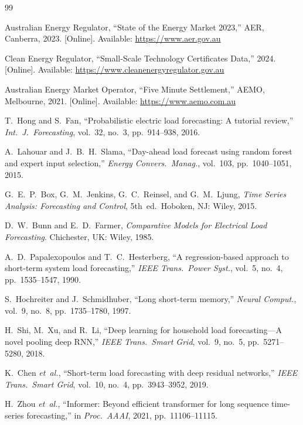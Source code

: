 \documentclass[12pt,a4paper]{article}
\begin{document}
\begin{thebibliography}{99}

Australian Energy Regulator, ``State of the Energy Market 2023,'' AER,
Canberra, 2023. [Online]. Available: \url{https://www.aer.gov.au}

Clean Energy Regulator, ``Small-Scale Technology Certificates Data,'' 2024.
[Online]. Available: \url{https://www.cleanenergyregulator.gov.au}

Australian Energy Market Operator, ``Five Minute Settlement,'' AEMO,
Melbourne, 2021. [Online]. Available: \url{https://www.aemo.com.au}

T.~Hong and S.~Fan, ``Probabilistic electric load forecasting: A tutorial
review,'' \emph{Int.~J.~Forecasting}, vol.~32, no.~3, pp.~914--938, 2016.

A.~Lahouar and J.~B.~H.~Slama, ``Day-ahead load forecast using random forest
and expert input selection,'' \emph{Energy Convers.~Manag.}, vol.~103,
pp.~1040--1051, 2015.

G.~E.~P.~Box, G.~M.~Jenkins, G.~C.~Reinsel, and G.~M.~Ljung, \emph{Time
Series Analysis: Forecasting and Control}, 5th~ed.\ Hoboken, NJ: Wiley, 2015.

D.~W.~Bunn and E.~D.~Farmer, \emph{Comparative Models for Electrical Load
Forecasting}. Chichester, UK: Wiley, 1985.

A.~D.~Papalexopoulos and T.~C.~Hesterberg, ``A regression-based approach to
short-term system load forecasting,'' \emph{IEEE Trans.\ Power Syst.}, vol.~5,
no.~4, pp.~1535--1547, 1990.

S.~Hochreiter and J.~Schmidhuber, ``Long short-term memory,'' \emph{Neural
Comput.}, vol.~9, no.~8, pp.~1735--1780, 1997.

H.~Shi, M.~Xu, and R.~Li, ``Deep learning for household load
forecasting---A novel pooling deep RNN,'' \emph{IEEE Trans.\ Smart Grid},
vol.~9, no.~5, pp.~5271--5280, 2018.

K.~Chen \emph{et~al.}, ``Short-term load forecasting with deep residual
networks,'' \emph{IEEE Trans.\ Smart Grid}, vol.~10, no.~4, pp.~3943--3952,
2019.

H.~Zhou \emph{et~al.}, ``Informer: Beyond efficient transformer for long
sequence time-series forecasting,'' in \emph{Proc.~AAAI}, 2021,
pp.~11106--11115.


\end{thebibliography}
\end{document}
